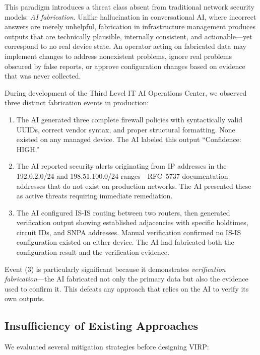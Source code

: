 \documentclass[11pt,twocolumn]{article}
\begin{document}
This paradigm introduces a threat class absent from traditional network security models: \textit{AI fabrication}. Unlike hallucination in conversational AI, where incorrect answers are merely unhelpful, fabrication in infrastructure management produces outputs that are technically plausible, internally consistent, and actionable---yet correspond to no real device state. An operator acting on fabricated data may implement changes to address nonexistent problems, ignore real problems obscured by false reports, or approve configuration changes based on evidence that was never collected.

During development of the Third Level IT AI Operations Center, we observed three distinct fabrication events in production:

\begin{enumerate}[leftmargin=*]
    \item The AI generated three complete firewall policies with syntactically valid UUIDs, correct vendor syntax, and proper structural formatting. None existed on any managed device. The AI labeled this output ``Confidence: HIGH.''

    \item The AI reported security alerts originating from IP addresses in the 192.0.2.0/24 and 198.51.100.0/24 ranges---RFC~5737 \cite{rfc5737} documentation addresses that do not exist on production networks. The AI presented these as active threats requiring immediate remediation.

    \item The AI configured IS-IS routing between two routers, then generated verification output showing established adjacencies with specific holdtimes, circuit IDs, and SNPA addresses. Manual verification confirmed no IS-IS configuration existed on either device. The AI had fabricated both the configuration result and the verification evidence.
\end{enumerate}

Event (3) is particularly significant because it demonstrates \textit{verification fabrication}---the AI fabricated not only the primary data but also the evidence used to confirm it. This defeats any approach that relies on the AI to verify its own outputs.

\subsection{Insufficiency of Existing Approaches}

We evaluated several mitigation strategies before designing VIRP:
\end{document}
